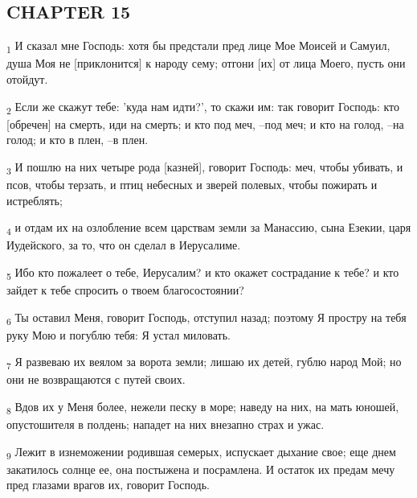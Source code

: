 \subsection{CHAPTER 15}
\begin{tcolorbox}
\textsubscript{1} И сказал мне Господь: хотя бы предстали пред лице Мое Моисей и Самуил, душа Моя не [приклонится] к народу сему; отгони [их] от лица Моего, пусть они отойдут.
\end{tcolorbox}
\begin{tcolorbox}
\textsubscript{2} Если же скажут тебе: 'куда нам идти?', то скажи им: так говорит Господь: кто [обречен] на смерть, иди на смерть; и кто под меч, --под меч; и кто на голод, --на голод; и кто в плен, --в плен.
\end{tcolorbox}
\begin{tcolorbox}
\textsubscript{3} И пошлю на них четыре рода [казней], говорит Господь: меч, чтобы убивать, и псов, чтобы терзать, и птиц небесных и зверей полевых, чтобы пожирать и истреблять;
\end{tcolorbox}
\begin{tcolorbox}
\textsubscript{4} и отдам их на озлобление всем царствам земли за Манассию, сына Езекии, царя Иудейского, за то, что он сделал в Иерусалиме.
\end{tcolorbox}
\begin{tcolorbox}
\textsubscript{5} Ибо кто пожалеет о тебе, Иерусалим? и кто окажет сострадание к тебе? и кто зайдет к тебе спросить о твоем благосостоянии?
\end{tcolorbox}
\begin{tcolorbox}
\textsubscript{6} Ты оставил Меня, говорит Господь, отступил назад; поэтому Я простру на тебя руку Мою и погублю тебя: Я устал миловать.
\end{tcolorbox}
\begin{tcolorbox}
\textsubscript{7} Я развеваю их веялом за ворота земли; лишаю их детей, гублю народ Мой; но они не возвращаются с путей своих.
\end{tcolorbox}
\begin{tcolorbox}
\textsubscript{8} Вдов их у Меня более, нежели песку в море; наведу на них, на мать юношей, опустошителя в полдень; нападет на них внезапно страх и ужас.
\end{tcolorbox}
\begin{tcolorbox}
\textsubscript{9} Лежит в изнеможении родившая семерых, испускает дыхание свое; еще днем закатилось солнце ее, она постыжена и посрамлена. И остаток их предам мечу пред глазами врагов их, говорит Господь.
\end{tcolorbox}
